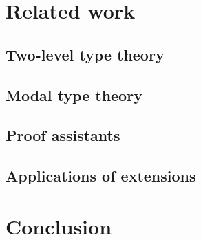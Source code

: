 \documentclass{article}
\begin{document}
\section{Related work} \label{sec:related}

\subsection{Two-level type theory}

\subsection{Modal type theory}

\subsection{Proof assistants}

\subsection{Applications of extensions}


\section{Conclusion}

\noindent

\end{document}
